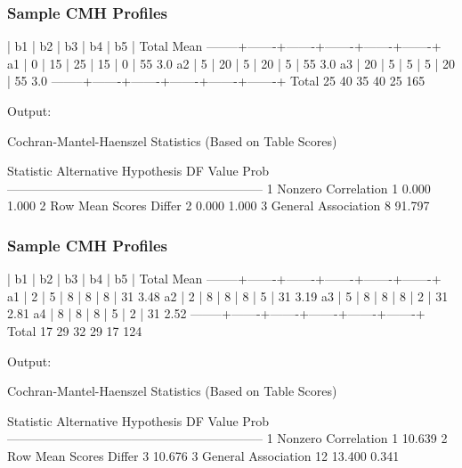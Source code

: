 \begin{frame}[fragile,t]
  \frametitle{Sample CMH Profiles}
\begin{listing}
        | b1    | b2    | b3    | b4    | b5    |  Total  Mean
--------+-------+-------+-------+-------+-------+
  a1    |     0 |    15 |    25 |    15 |     0 |     55   3.0
  a2    |     5 |    20 |     5 |    20 |     5 |     55   3.0
  a3    |    20 |     5 |     5 |     5 |    20 |     55   3.0
--------+-------+-------+-------+-------+-------+
Total        25      40      35      40      25      165
\end{listing}
\vspace{2ex}
Output:
\begin{Output}[gobble=4]
      Cochran-Mantel-Haenszel Statistics (Based on Table Scores)

    Statistic   Alternative Hypothesis    DF       Value      Prob
    --------------------------------------------------------------
       1        Nonzero Correlation        1       0.000     1.000
       2        Row Mean Scores Differ     2       0.000     1.000
       3        General Association        8      91.797     
\end{Output}
\end{frame}

\begin{frame}[fragile,t]
  \frametitle{Sample CMH Profiles}

\begin{listing}
        | b1    | b2    | b3    | b4    | b5    |  Total   Mean
--------+-------+-------+-------+-------+-------+
  a1    |     2 |     5 |     8 |     8 |     8 |     31   3.48
  a2    |     2 |     8 |     8 |     8 |     5 |     31   3.19
  a3    |     5 |     8 |     8 |     8 |     2 |     31   2.81
  a4    |     8 |     8 |     8 |     5 |     2 |     31   2.52
--------+-------+-------+-------+-------+-------+
Total        17      29      32      29      17      124
\end{listing}
\vspace{2ex}
Output:
\begin{Output}[gobble=4]
      Cochran-Mantel-Haenszel Statistics (Based on Table Scores)

    Statistic   Alternative Hypothesis    DF       Value      Prob
    --------------------------------------------------------------
       1        Nonzero Correlation        1      10.639     
       2        Row Mean Scores Differ     3      10.676     
       3        General Association       12      13.400     0.341
\end{Output}
\end{frame}

